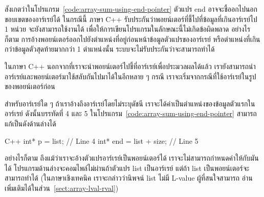 สังเกต{\wbr}ว่า{\wbr}ใน{\wbr}โปรแกรม~\ref{code:array-sum-using-end-pointer} ตัวแปร {\ct
  end} อาจ{\wbr}จะ{\wbr}ชี้{\wbr}ออก{\wbr}ไป{\wbr}นอก{\wbr}ขอบเขต{\wbr}ของ{\wbr}อาร์{\wbr}เรย์{\wbr}ได้ ใน{\wbr}กรณี{\wbr}นี้ ภาษา C++
รับประกัน{\wbr}ว่า{\wbr}พอยน์เตอร์{\wbr}ที่{\wbr}ชี้{\wbr}ไป{\wbr}ที่{\wbr}ข้อมูล{\wbr}ที่{\wbr}เกิน{\wbr}อาร์{\wbr}เรย์{\wbr}ไป 1 หน่วย จะ{\wbr}ยัง{\wbr}สามารถ{\wbr}ใช้งาน{\wbr}ได้{\wbr}
เพื่อ{\wbr}ให้การ{\wbr}เขียน{\wbr}โปรแกรม{\wbr}ใน{\wbr}ลักษณะ{\wbr}นี้{\wbr}ไม่{\wbr}เกิด{\wbr}ข้อ{\wbr}ผิดพลาด อย่างไร{\wbr}ก็{\wbr}ตาม{\wbr}
การ{\wbr}อ้าง{\wbr}พอยน์เตอร์{\wbr}ออก{\wbr}ไป{\wbr}ยัง{\wbr}ตำแหน่ง{\wbr}ที่{\wbr}อยู่{\wbr}ก่อนหน้า{\wbr}ข้อมูล{\wbr}ตัวแปร{\wbr}ของ{\wbr}อาร์{\wbr}เรย์
หรือ{\wbr}ตำแหน่ง{\wbr}ที่{\wbr}เกิน{\wbr}กว่า{\wbr}ข้อมูล{\wbr}ตัว{\wbr}สุดท้าย{\wbr}มาก{\wbr}กว่า 1 ตำแหน่ง{\wbr}นั้น{\wbr}
ระบบ{\wbr}จะ{\wbr}ไม่{\wbr}รับประกัน{\wbr}ว่า{\wbr}จะ{\wbr}สามารถ{\wbr}ทำ{\wbr}ได้{\wbr}

ใน{\wbr}ภาษา C++ นอกจาก{\wbr}ที่{\wbr}เรา{\wbr}จะ{\wbr}นำ{\wbr}พอยน์เตอร์{\wbr}ไป{\wbr}ชี้{\wbr}ที่{\wbr}อาร์{\wbr}เรย์{\wbr}เพื่อ{\wbr}ประมวล{\wbr}ผล{\wbr}ได้{\wbr}แล้ว{\wbr}
เรา{\wbr}ยัง{\wbr}สามารถ{\wbr}นำ{\wbr}อาร์{\wbr}เรย์{\wbr}และ{\wbr}พอยน์เตอร์{\wbr}มา{\wbr}ใช้{\wbr}สลับ{\wbr}กัน{\wbr}ไป{\wbr}มา{\wbr}ได้{\wbr}ใน{\wbr}อีก{\wbr}หลาย ๆ กรณี{\wbr}
เรา{\wbr}จะ{\wbr}เริ่ม{\wbr}จาก{\wbr}กรณี{\wbr}ที่{\wbr}ใช้{\wbr}อาร์{\wbr}เรย์{\wbr}ใน{\wbr}รูป{\wbr}ของ{\wbr}พอยน์เตอร์{\wbr}ก่อน{\wbr}

สำหรับ{\wbr}อาร์{\wbr}เรย์{\wbr}ใด ๆ ถ้า{\wbr}เรา{\wbr}อ้าง{\wbr}ถึง{\wbr}อาร์{\wbr}เรย์{\wbr}โดย{\wbr}ไม่{\wbr}ระบุ{\wbr}ดัชนี{\wbr}
เรา{\wbr}จะ{\wbr}ได้{\wbr}ค่า{\wbr}เป็น{\wbr}ตำแหน่ง{\wbr}ของ{\wbr}ข้อมูล{\wbr}ตัว{\wbr}แรก{\wbr}ใน{\wbr}อาร์{\wbr}เรย์ ดังนั้น{\wbr}บรรทัด{\wbr}ที่ 4 และ 5
ใน{\wbr}โปรแกรม~\ref{code:array-sum-using-end-pointer} สามารถ{\wbr}แก้{\wbr}เป็น{\wbr}ดัง{\wbr}ด้าน{\wbr}ล่าง{\wbr}ได้{\wbr}

\latintext
\begin{codelist}{C++}{}
  int* p = list;                 // Line 4
  int* end = list + size;        // Line 5
\end{codelist}
\thaitext

อย่างไร{\wbr}ก็{\wbr}ตาม ถึง{\wbr}แม้{\wbr}ว่า{\wbr}เรา{\wbr}จะ{\wbr}อ้าง{\wbr}ตัวแปร{\wbr}อาร์{\wbr}เรย์{\wbr}เป็น{\wbr}พอยน์เตอร์{\wbr}ได้{\wbr}
เรา{\wbr}จะ{\wbr}ไม่{\wbr}สามารถ{\wbr}กำหนด{\wbr}ค่า{\wbr}ให้{\wbr}กับ{\wbr}มัน{\wbr}ได้ โปรแกรม{\wbr}ด้าน{\wbr}ล่าง{\wbr}จะ{\wbr}คอมไพล์{\wbr}ไม่{\wbr}ผ่าน{\wbr}ถ้า{\wbr}ตัวแปร {\ct
  list} เป็น{\wbr}อาร์{\wbr}เรย์ แต่{\wbr}ถ้า {\ct list} เป็น{\wbr}พอยน์เตอร์{\wbr}จะ{\wbr}สามารถ{\wbr}ทำ{\wbr}ได้{\wbr}
(ใน{\wbr}ภาษา{\wbr}เชิง{\wbr}เทคนิค เรา{\wbr}จะ{\wbr}กล่าว{\wbr}ว่า{\wbr}นิพจน์ {\ct list} ไม่{\wbr}มี L-value ผู้{\wbr}ที่{\wbr}สนใจ{\wbr}สามารถ{\wbr}
อ่าน{\wbr}เพิ่มเติม{\wbr}ได้{\wbr}ใน{\wbr}ส่วน~\ref{sect:array-lval-rval})

